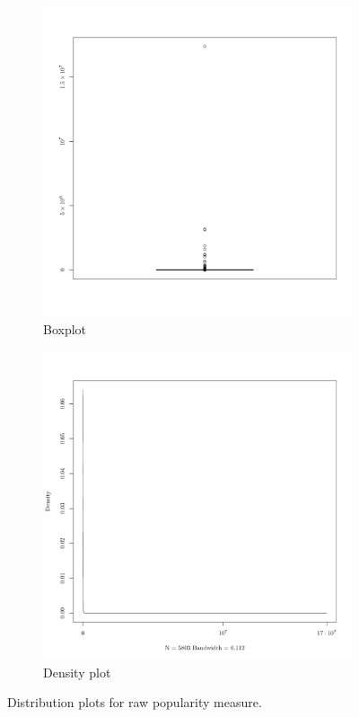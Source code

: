 \begin{figure}[!htb]
    \centering
    \begin{subfigure}[b]{0.3\textwidth}
        \includegraphics[width=\textwidth]{figures/popuInitialBox}
        \caption{Boxplot}
        \label{fig:popuInitialBox}
    \end{subfigure}
    \quad
    \begin{subfigure}[b]{0.3\textwidth}
        \includegraphics[width=\textwidth]{figures/popuInitialDensity}
        \caption{Density plot}
        \label{fig:popuInitialDensity}
    \end{subfigure}
    \caption{Distribution plots for raw popularity measure.}
\end{figure}
